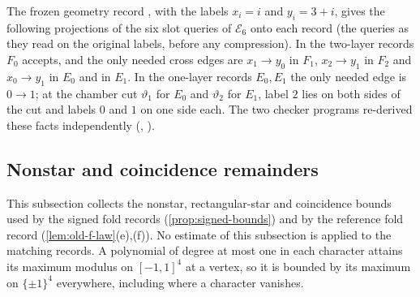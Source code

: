 \begin{certificate}\label{cert:record:middle-geometry}
The frozen geometry record
, with the
labels $x_i=i$ and $y_i=3+i$, gives the following projections of
the six slot queries of $\mathcal E_6$ onto each record (the
queries as they read on the original labels, before any
compression). In the two-layer records $F_0$ accepts, and the only needed
cross edges are $x_1\to y_0$ in $F_1$, $x_2\to y_1$ in $F_2$ and $x_0\to y_1$ in
$E_0$ and in $E_1$. In the one-layer records $E_0,E_1$ the only needed edge is
$0\to1$; at the chamber cut $\vartheta_1$ for $E_0$ and $\vartheta_2$ for $E_1$,
label $2$ lies on both sides of the cut and labels $0$ and $1$ on one side each.
The two checker programs re-derived these facts independently
(,
).
\end{certificate}

\subsection{Nonstar and coincidence remainders}\label{subsec:record:f_remainders}

This subsection collects the nonstar, rectangular-star and coincidence bounds
used by the signed fold records (\cref{prop:signed-bounds}) and by the
reference fold record (\cref{lem:old-f-law}(e),(f)). No estimate of this
subsection is applied to the matching records. A polynomial of degree at most
one in each character attains its maximum modulus on $[-1,1]^4$ at a vertex,
so it is bounded by its maximum on $\{\pm1\}^4$ everywhere, including where a
character vanishes.

